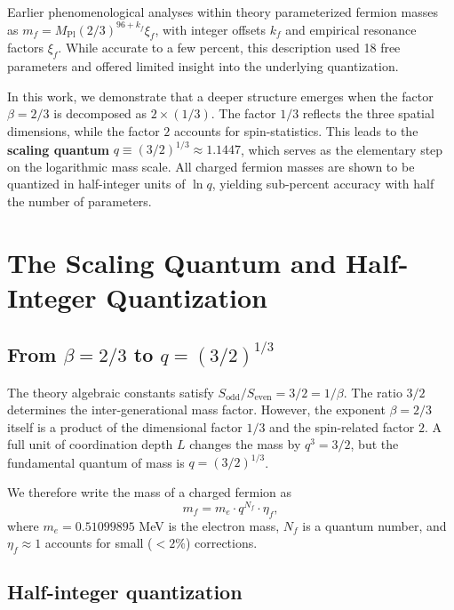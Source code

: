 \documentclass[12pt,a4paper]{article}
\begin{document}
	Earlier phenomenological analyses within theory parameterized fermion masses \\ as $m_f = M_{\mathrm{Pl}}(2/3)^{96+k_f}\xi_f$, with integer offsets $k_f$ and empirical resonance factors $\xi_f$. While accurate to a few percent, this description used 18 free parameters and offered limited insight into the underlying quantization. 
	
	In this work, we demonstrate that a deeper structure emerges when the factor $\beta = 2/3$ is decomposed as $2 \times (1/3)$. The factor $1/3$ reflects the three spatial dimensions, while the factor $2$ accounts for spin-statistics. This leads to the \textbf{scaling quantum} $q \equiv (3/2)^{1/3} \approx 1.1447$, which serves as the elementary step on the logarithmic mass scale. All charged fermion masses are shown to be quantized in half-integer units of $\ln q$, yielding sub-percent accuracy with half the number of parameters.
	
	\section{The Scaling Quantum and Half-Integer Quantization}
	
	\subsection{From $\beta = 2/3$ to $q = (3/2)^{1/3}$}
	
	The theory algebraic constants satisfy $S_{\mathrm{odd}}/S_{\mathrm{even}} = 3/2 = 1/\beta$. The ratio $3/2$ determines the inter-generational mass factor. However, the exponent $\beta = 2/3$ itself is a product of the dimensional factor $1/3$ and the spin-related factor $2$. A full unit of coordination depth $L$ changes the mass by $q^3 = 3/2$, but the fundamental quantum of mass is $q = (3/2)^{1/3}$.
	
	We therefore write the mass of a charged fermion as
	\begin{equation}
		m_f = m_e \cdot q^{N_f} \cdot \eta_f,
		\label{eq:quantized}
	\end{equation}
	where $m_e = 0.51099895$ MeV is the electron mass, $N_f$ is a quantum number, and $\eta_f \approx 1$ accounts for small ($<2\%$) corrections.
	
	\subsection{Half-integer quantization}
	
\end{document}
